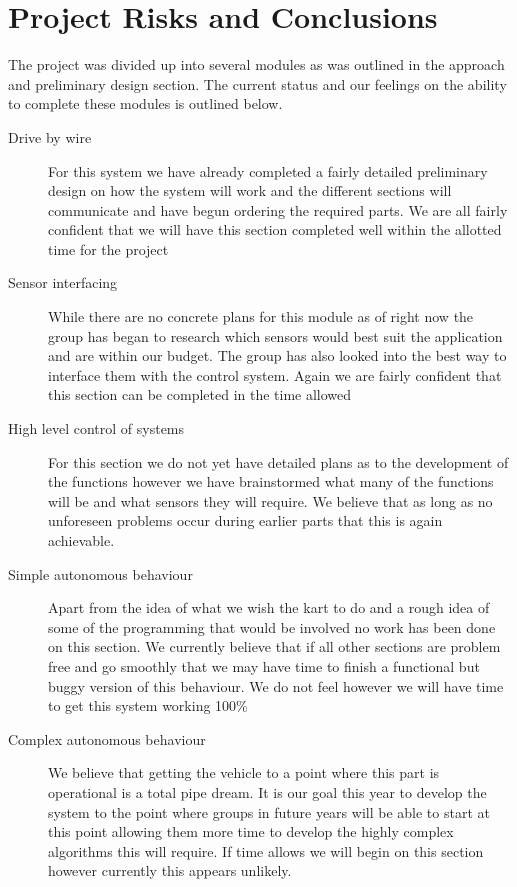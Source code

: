 \chapter{Project Risks and Conclusions}

The project was divided up into several modules as was outlined in the approach and preliminary design section. The current status and our feelings on the ability to complete these modules is outlined below.

\begin{description}
\item[Drive by wire] For this system we have already completed a fairly detailed preliminary design on how the system will work and the different sections will communicate and have begun ordering the required parts. We are all fairly confident that we will have this section completed well within the allotted time for the project

\item[Sensor interfacing] While there are no concrete plans for this module as of right now the group has began to research which sensors would best suit the application and are within our budget. The group has also looked into the best way to interface them with the control system. Again we are fairly confident that this section can be completed in the time allowed

\item[High level control of systems] For this section we do not yet have detailed plans as to the development of the functions however we have brainstormed what many of the functions will be and what sensors they will require. We believe that as long as no unforeseen problems occur during earlier parts that this is again achievable.

\item[Simple autonomous behaviour] Apart from the idea of what we wish the kart to do and a rough idea of some of the programming that would be involved no work has been done on this section. We currently believe that if all other sections are problem free and go smoothly that we may have time to finish a functional but buggy version of this behaviour. We do not feel however we will have time to get this system working 100\%

\item[Complex autonomous behaviour] We believe that getting the vehicle to a point where this part is operational is a total pipe dream. It is our goal this year to develop the system to the point where groups in future years will be able to start at this point allowing them more time to develop the highly complex algorithms this will require. If time allows we will begin on this section however currently this appears unlikely.
\end{description}